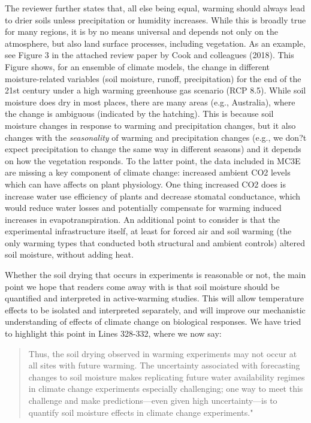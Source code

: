 \documentclass[11pt,a4paper]{letter}
\begin{document}
\begin{letter}{}
\begin{enumerate}
\begin{enumerate}
\par The reviewer further states that, all else being equal, warming should always lead to drier soils unless precipitation or humidity increases. While this is broadly true for many regions, it is by no means universal and depends not only on the atmosphere, but also land surface processes, including vegetation. As an example, see Figure 3 in the attached review paper by Cook and colleagues (2018). This Figure shows, for an ensemble of climate models, the change in different moisture-related variables (soil moisture, runoff, precipitation) for the end of the 21st century under a high warming greenhouse gas scenario (RCP 8.5). While soil moisture does dry in most places, there are many areas (e.g., Australia), where the change is ambiguous (indicated by the hatching). This is because soil moisture changes in response to warming and precipitation changes, but it also changes with the \emph{seasonality} of warming and precipitation changes (e.g., we don?t expect precipitation to change the same way in different seasons) and it depends on how the vegetation responds. To the latter point, the data included in MC3E are missing a key component of climate change: increased ambient CO2 levels which can have affects on plant physiology. One thing increased CO2 does is increase water use efficiency of plants and decrease stomatal conductance, which would reduce water losses and potentially compensate for warming induced increases in evapotranspiration. An additional point to consider is that the experimental infrastructure itself, at least for forced air and soil warming (the only warming types that conducted both structural and ambient controls) altered soil moisture, without adding heat. \\

\par Whether the soil drying that occurs in experiments is reasonable or not, the main point we hope that readers come away with is that soil moisture should be quantified and interpreted in active-warming studies. This will allow temperature effects to be isolated and interpreted separately, and will improve our mechanistic understanding of effects of climate change on biological responses. We have tried to highlight this point in Lines 328-332, where we now say:
\begin{quote}
Thus, the soil drying observed in warming experiments may not occur at all sites with future warming. The uncertainty associated with forecasting changes to soil moisture makes replicating future water availability regimes in climate change experiments especially challenging; one way to meet this challenge and make predictions---even given high uncertainty---is to quantify soil moisture effects in climate change experiments."
\end{quote}


\end{enumerate}
\end{enumerate}
\end{letter}
\end{document}
